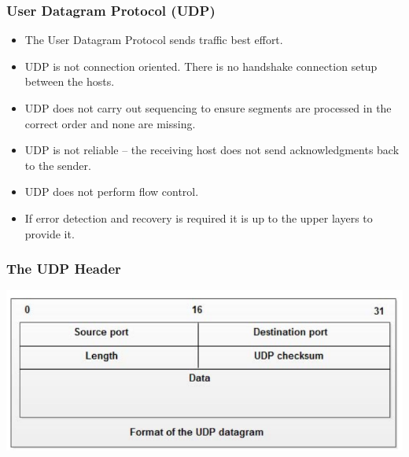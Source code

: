 \documentclass[pdflatex,compress]{beamer}
\begin{document}
\begin{frame}
	\frametitle{User Datagram Protocol (UDP)}
	\begin{itemize}
		\item The User Datagram Protocol sends traffic best effort.
		\item UDP is not connection oriented. There is no handshake connection setup between the hosts.
		\item UDP does not carry out sequencing to ensure segments are processed in the correct order and none are missing.
		\item UDP is not reliable – the receiving host does not send acknowledgments back to the sender.
		\item UDP does not perform flow control.
		\item If error detection and recovery is required it is up to the upper layers to provide it.
	\end{itemize}
\end{frame}

\begin{frame}
	\frametitle{The UDP Header}
	\begin{center}
		\includegraphics[width=\linewidth]{img/img13}
	\end{center}
\end{frame}
\end{document}
